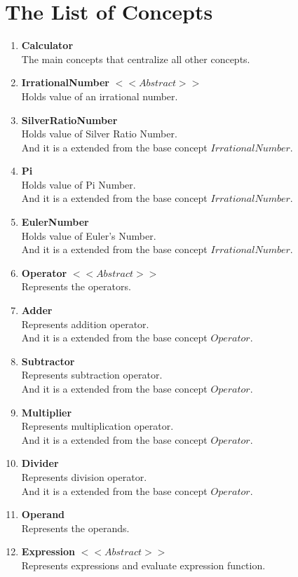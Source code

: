 \section{The List of Concepts}
\begin{enumerate}
  \item \textbf{Calculator} \\ The main concepts that centralize all other concepts.
  \item \textbf{IrrationalNumber} $<<Abstract>>$ \\ Holds value of an irrational number.
  \item \textbf{SilverRatioNumber} \\ Holds value of Silver Ratio Number. \\ And it is a extended from the base concept $IrrationalNumber$.
  \item \textbf{Pi} \\ Holds value of Pi Number. \\ And it is a extended from the base concept $IrrationalNumber$.
  \item \textbf{EulerNumber}  \\ Holds value of Euler's Number. \\ And it is a extended from the base concept $IrrationalNumber$.
  \item \textbf{Operator} $<<Abstract>>$ \\ Represents the operators.
  \item \textbf{Adder}  \\ Represents addition operator. \\ And it is a extended from the base concept $Operator$.
  \item \textbf{Subtractor} \\ Represents subtraction operator. \\ And it is a extended from the base concept $Operator$.
  \item \textbf{Multiplier} \\ Represents multiplication operator. \\ And it is a extended from the base concept $Operator$.
  \item \textbf{Divider} \\ Represents division operator. \\ And it is a extended from the base concept $Operator$.
  \item \textbf{Operand} \\ Represents the operands.
  \item \textbf{Expression} $<<Abstract>>$ \\ Represents expressions and evaluate expression function.

\end{enumerate}
